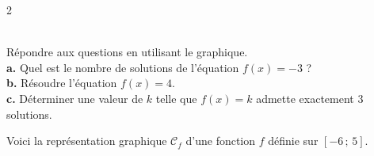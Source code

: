 {\begin{multicols}{2}
\begin{Exercice}
\begin{tikzpicture}[baseline,scale = 0.6]
\end{tikzpicture}\\Répondre aux questions en utilisant le graphique.\\\textbf {a.} Quel est le nombre de solutions de l'équation $f(x)=-3$ ?\\\textbf {b.} Résoudre l'équation $f(x)=4$.\\\textbf {c.} Déterminer une valeur de $k$ telle que $f(x)=k$ admette exactement $3$ solutions.

\end{Exercice}

\columnbreak

\begin{Exercice}%

Voici la représentation graphique $\mathscr{C}_f$ d'une fonction $f$ définie sur $[-6\,;\,5]$.\\
\end{Exercice}
\end{multicols}}
